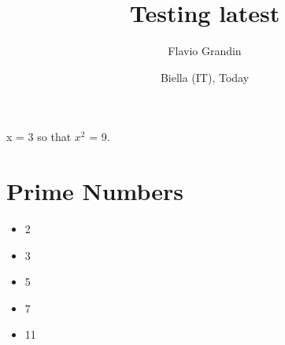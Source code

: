 \documentclass{article}
\title{Testing latest}
\author{Flavio Grandin}
\date{Biella (IT), Today}
\begin{document}
x = 3 so that $x^2$ = 9.
\section{Prime Numbers}
\begin{itemize}
\item 2
\item 3
\item 5
\item 7
\item 11
\end{itemize}
\end{document}
